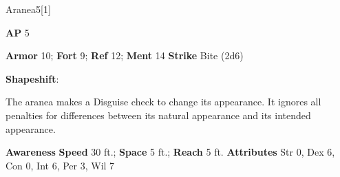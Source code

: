 \begin{monsection}{Aranea}{5}[1]
\vspace{-1em}\vspace{-1em}
\begin{spellcontent}
\begin{spelltargetinginfo}
{\textbf{AP} 5}

\pari \textbf{Armor} 10;
\textbf{Fort} 9;
\textbf{Ref} 12;
\textbf{Ment} 14
\pari \textbf{Strike} Bite  (2d6)



\end{spelltargetinginfo}


\begin{spelleffects}

\pari
\textbf{Shapeshift}:

The aranea makes a Disguise check to change its appearance.
It ignores all penalties for differences between its natural appearance and its intended appearance.




\end{spelleffects}

\end{spellcontent}

\begin{monsterfooter}
\pari \textbf{Awareness} 
\pari \textbf{Speed} 30 ft.;
\textbf{Space} 5 ft.;
\textbf{Reach} 5 ft.
\pari \textbf{Attributes}
Str 0,
Dex 6,
Con 0,
Int 6,
Per 3,
Wil 7
\end{monsterfooter}
\end{monsection}



